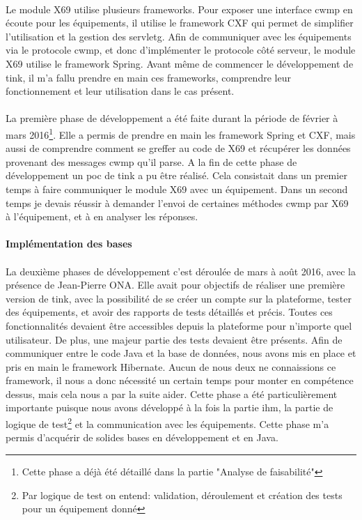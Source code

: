 \documentclass[12pt,a4paper]{report}
\begin{document}
\paragraph*{}Le module X69 utilise plusieurs frameworks. Pour exposer une interface \gls{cwmp} en écoute pour les équipements, il utilise le framework CXF qui permet de simplifier l'utilisation et la gestion des \gls{servletg}. Afin de communiquer avec les équipements via le protocole \gls{cwmp}, et donc d'implémenter le protocole côté serveur, le module X69 utilise le framework Spring. Avant même de commencer le développement de \gls{tink}, il m'a fallu prendre en main ces frameworks, comprendre leur fonctionnement et leur utilisation dans le cas présent.
\paragraph*{}La première phase de développement a été faite durant la période de février à mars 2016\footnote{Cette phase a déjà été détaillé dans la partie "Analyse de faisabilité"}. Elle a permis de prendre en main les framework Spring et CXF, mais aussi de comprendre comment se greffer au code de X69 et récupérer les données provenant des messages \gls{cwmp} qu'il parse. A la fin de cette phase de développement un \gls{poc} de \gls{tink} a pu être réalisé. Cela consistait dans un premier temps à faire communiquer le module X69 avec un équipement. Dans un second temps je devais réussir à demander l'envoi de certaines méthodes \gls{cwmp} par X69 à l'équipement, et à en analyser les réponses.
\paragraph{Implémentation des bases}
\paragraph*{}La deuxième phases de développement c'est déroulée de mars à août 2016, avec la présence de Jean-Pierre ONA. Elle avait pour objectifs de réaliser une première version de \gls{tink}, avec la possibilité de se créer un compte sur la plateforme, tester des équipements, et avoir des rapports de tests détaillés et précis. Toutes ces fonctionnalités devaient être accessibles depuis la plateforme pour n'importe quel utilisateur. De plus, une majeur partie des tests devaient être présents. Afin de communiquer entre le code Java et la base de données, nous avons mis en place et pris en main le framework Hibernate. Aucun de nous deux ne connaissions ce framework, il nous a donc nécessité un certain temps pour monter en compétence dessus, mais cela nous a par la suite aider. Cette phase a été particulièrement importante puisque nous avons développé à la fois la partie \gls{ihm}, la partie de logique de test\footnote{Par logique de test on entend: validation, déroulement et création des tests pour un équipement donné} et la communication avec les équipements. Cette phase m'a permis d'acquérir de solides bases en développement et en Java.
\end{document}
